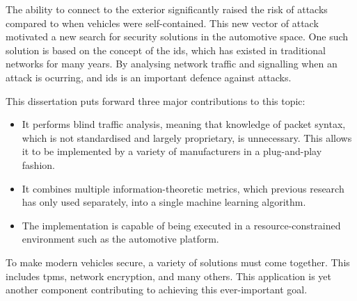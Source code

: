 The ability to connect to the exterior significantly raised the risk of attacks compared to when vehicles were self-contained. This new vector of attack motivated a new search for security solutions in the automotive space. One such solution is based on the concept of the \gls{ids}, which has existed in traditional networks for many years. By analysing network traffic and signalling when an attack is ocurring, and \gls{ids} is an important defence against attacks.\par

This dissertation puts forward three major contributions to this topic:

\begin{itemize}
    \item It performs blind traffic analysis, meaning that knowledge of packet syntax, which is not standardised and largely proprietary, is unnecessary. This allows it to be implemented by a variety of manufacturers in a plug-and-play fashion.
    \item It combines multiple information-theoretic metrics, which previous research has only used separately, into a single machine learning algorithm.
    \item The implementation is capable of being executed in a resource-constrained environment such as the automotive platform.
\end{itemize}

To make modern vehicles secure, a variety of solutions must come together. This includes \glspl{tpm}, network encryption, and many others. This application is yet another component contributing to achieving this ever-important goal.